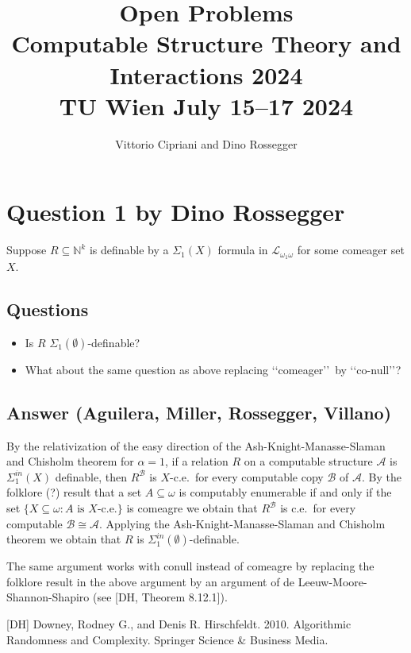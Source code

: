 \documentclass{article}
\title{Open Problems \\Computable Structure Theory and Interactions 2024 \\ TU Wien July
15--17 2024}
\author{Vittorio Cipriani and Dino Rossegger}
\date{}
\begin{document}
\maketitle




\section*{Question 1 {\small{by Dino Rossegger}}}
Suppose $R \subseteq \mathbb{N}^k$ is definable by a $\Sigma_1(X)$ formula in $\mathcal{L}_{\omega_1\omega}$ for some comeager set $X$.

\subsection*{Questions}
\begin{itemize}
    \item Is $R$ $\Sigma_1(\emptyset)$-definable?
    \item What about the same question as above replacing \lq\lq comeager\rq\rq\ by \lq\lq co-null\rq\rq?
\end{itemize}

\subsection*{Answer (Aguilera, Miller, Rossegger, Villano)}
By the relativization of the easy direction of the Ash-Knight-Manasse-Slaman and
Chisholm theorem for $\alpha=1$, if a relation $R$ on a
computable structure $\mathcal A$ is $\Sigma_1^{in}(X)$ definable, then
$R^\mathcal{B}$ is $X$-c.e.\ for every computable copy $\mathcal B$ of $\mathcal
A$. By the folklore (?) result that a set $A\subseteq \omega$ is computably
enumerable if and only if the set $\{ X\subseteq \omega: A\text{ is $X$-c.e.}\}$
is comeagre we obtain that $R^\mathcal{B}$ is c.e.\ for every computable
$\mathcal B\cong \mathcal A$. Applying the Ash-Knight-Manasse-Slaman and
Chisholm theorem we obtain that $R$ is $\Sigma^{in}_1(\emptyset)$-definable.

The same argument works with conull instead of comeagre by replacing the
folklore result in the above argument by an argument of de
Leeuw-Moore-Shannon-Shapiro (see [DH, Theorem 8.12.1]).

[DH] Downey, Rodney G., and Denis R. Hirschfeldt. 2010. Algorithmic Randomness
and Complexity. Springer Science \& Business Media.
\end{document}
